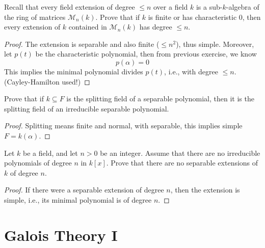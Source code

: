 \documentclass[openany]{book}
\begin{document}
\begin{prob}
Recall that every field extension of degree $\leq n$ over a field $k$ is a sub-$k$-algebra of the ring of matrices $\mathcal{M}_n(k)$. Prove that if $k$ is finite or has characteristic 0, then every extension of $k$ contained in $\mathcal{M}_n(k)$ has degree $\leq n$.
\end{prob}
\begin{proof}
    The extension is separable and also finite ($\leq n^2$), thus simple. Moreover, let $p(t)$ be the characteristic polynomial, then from previous exercise, we know 
    \begin{equation*}
        p(\alpha)=0
    \end{equation*}
    This implies the minimal polynomial divides $p(t)$, i.e., with degree $\leq n$. (Cayley-Hamilton used!)
\end{proof}


\begin{prob}[HW]
Prove that if $k \subseteq F$ is the splitting field of a separable polynomial, then it is the splitting field of an irreducible separable polynomial.
\end{prob}
\begin{proof}
    Splitting means finite and normal, with separable, this implies simple $F=k(\alpha)$.
\end{proof}


\begin{prob}
Let $k$ be a field, and let $n > 0$ be an integer. Assume that there are no irreducible polynomials of degree $n$ in $k[x]$. Prove that there are no separable extensions of $k$ of degree $n$.
\end{prob}
\begin{proof}
    If there were a separable extension of degree $n$, then the extension is simple, i.e., its minimal polynomial is of degree $n$.
\end{proof}




\section{Galois Theory I}
\end{document}
